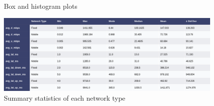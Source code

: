 \documentclass[
  letterpaper,
  DIV=11,
  numbers=noendperiod,
  oneside]{scrartcl}
\begin{document}
\begin{figure}
\begin{minipage}[t]{0.50\linewidth}
{{}

}

\end{minipage}%
\newline
\begin{minipage}[t]{0.50\linewidth}

{\centering 


}

\end{minipage}%

\caption{\label{fig-distplots}Box and histogram plots}

\end{figure}

\begin{figure}

{\centering \includegraphics{des_ana.png}

}

\caption{\label{fig-stats}Summary statistics of each network type}

\end{figure}
\end{document}
